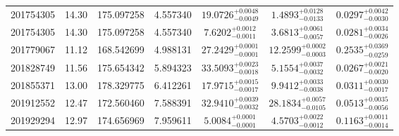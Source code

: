 \begin{tabular}{ccccccc}
201754305 &14.30& 175.097258 & 4.557340 & $19.0726_{-0.0049}^{+0.0048}$ & $1.4893_{-0.0133}^{+0.0128}$ & $0.0297_{-0.0030}^{+0.0042}$ \\
201754305 &14.30& 175.097258 & 4.557340 & $7.6202_{-0.0011}^{+0.0012}$ & $3.6813_{-0.0057}^{+0.0061}$ & $0.0281_{-0.0026}^{+0.0034}$ \\
201779067 &11.12& 168.542699 & 4.988131 & $27.2429_{-0.0001}^{+0.0001}$ & $12.2599_{-0.0003}^{+0.0002}$ & $0.2535_{-0.0259}^{+0.0369}$ \\
201828749 &11.56& 175.654342 & 5.894323 & $33.5093_{-0.0018}^{+0.0023}$ & $5.1554_{-0.0032}^{+0.0037}$ & $0.0267_{-0.0020}^{+0.0021}$ \\
201855371 &13.00& 178.329775 & 6.412261 & $17.9715_{-0.0017}^{+0.0015}$ & $9.9412_{-0.0038}^{+0.0033}$ & $0.0311_{-0.0017}^{+0.0030}$ \\
201912552 &12.47& 172.560460 & 7.588391 & $32.9410_{-0.0032}^{+0.0039}$ & $28.1834_{-0.0105}^{+0.0057}$ & $0.0513_{-0.0056}^{+0.0035}$ \\
201929294 &12.97& 174.656969 & 7.959611 & $5.0084_{-0.0001}^{+0.0001}$ & $4.5703_{-0.0012}^{+0.0022}$ & $0.1163_{-0.0014}^{+0.0011}$ \\
\bottomrule
\end{tabular}
